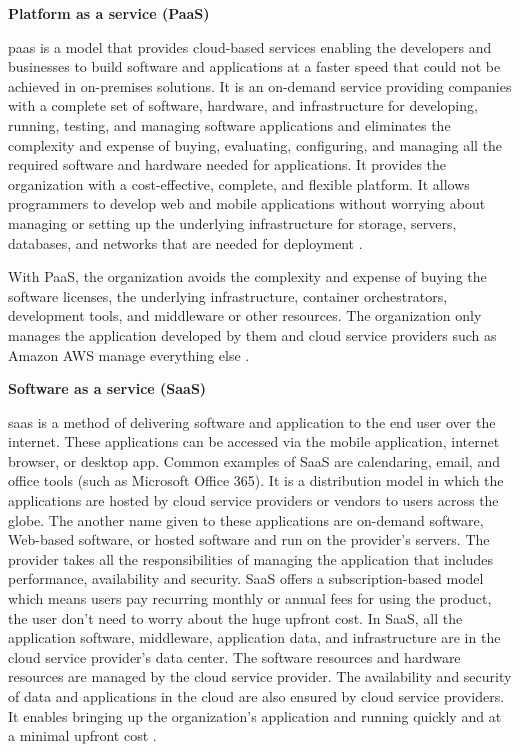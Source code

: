 \clearpage
\textbf{Platform as a service (PaaS)}
\par \gls{paas} is a model that provides cloud-based
services
enabling the developers and businesses to build software
and applications at a faster speed that could not be
achieved in on-premises solutions.
It is an on-demand service providing companies with a
complete set of software, hardware, and infrastructure for
developing, running, testing, and managing software
applications and eliminates the complexity and expense of
buying, evaluating, configuring, and managing all the
required software and hardware needed for applications.
It provides the organization with a cost-effective,
complete, and flexible platform.
It allows programmers to develop web and mobile
applications without worrying about managing or setting up the underlying infrastructure for storage, servers, databases, and networks that are needed for deployment \cite{15}.


\par With PaaS, the organization avoids the complexity and expense of buying the software licenses, the underlying infrastructure, container orchestrators, development tools, and middleware or other resources.
The organization only manages the application developed
by them and cloud service providers such as Amazon AWS
manage everything else \cite{15}.\\

\hfill \break

\textbf{Software as a service (SaaS)}
\par \gls{saas} is a method of delivering software and
application
to the end user over the internet.
These applications can be accessed via the
mobile application, internet browser, or desktop app.
Common examples of SaaS are calendaring, email, and office tools (such as Microsoft Office 365).
It is a distribution model in which the applications are hosted by cloud service providers or vendors to users across the globe.
The another name given to these applications are
on-demand
software, Web-based software, or hosted software and run
on the provider's servers.
The provider takes all the responsibilities of managing the application that includes performance, availability and security.
SaaS offers a subscription-based model
which
means users pay recurring monthly or annual fees for
using the product, the user don’t need to worry
about the huge
upfront cost.
In SaaS, all the
application software, middleware, application data, and infrastructure are in the cloud service provider’s data center.
The software resources and hardware resources are managed
by the
cloud
service provider.
The availability and security of data and applications in the cloud are also ensured by cloud service providers.
It enables bringing up the organization’s application and
running quickly and at a minimal upfront cost \cite{15}.

